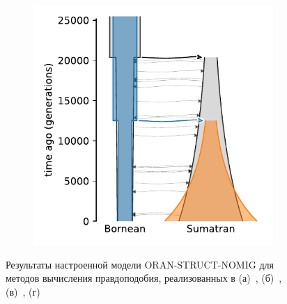 \begin{figure}[ht]
\begin{subfigure}[b]{0.24\linewidth}
        \caption{}
        \label{fig:part2:experiments:sim2:results:oran_struct_nomig_momi}
    \end{subfigure}%
    \begin{subfigure}[b]{0.24\linewidth}
        \centering
        \includegraphics[width=\textwidth]{images_experiments/suimulation_2_stdpopsim/ORAN-STRUCT-NOMIG/momentsLD.pdf}
        \caption{}
        \label{fig:part2:experiments:sim2:results:oran_struct_nomig_momentsLD}
    \end{subfigure}
    \caption{Результаты настроенной модели ORAN-STRUCT-NOMIG для методов вычисления правдоподобия, реализованных в (а)~\dadi, (б)~\moments, (в)~\momi, (г)~\momentsLD}
    \label{fig:part2:experiments:sim2:results:oran_struct_nomig}
\end{figure}

